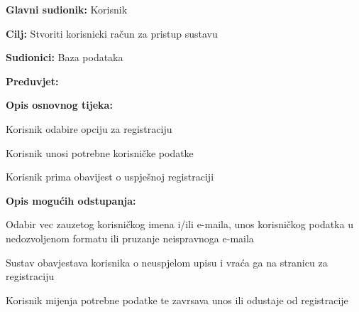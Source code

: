 					\noindent {}
					\begin{packed_item}

						\item \textbf{Glavni sudionik:} Korisnik
						\item  \textbf{Cilj:} Stvoriti korisnicki račun za pristup sustavu
						\item  \textbf{Sudionici:} Baza podataka
						\item  \textbf{Preduvjet:} 
						\item  \textbf{Opis osnovnog tijeka:}

						\item[] \begin{packed_enum}

							\item Korisnik odabire opciju za registraciju
							\item Korisnik unosi potrebne korisničke podatke
							\item Korisnik prima obavijest o uspješnoj registraciji 

						\end{packed_enum}

						\item  \textbf{Opis mogućih odstupanja:}

						\item[] \begin{packed_item}

							\item[2.a] Odabir vec zauzetog korisničkog imena i/ili e-maila, unos korisničkog podatka u nedozvoljenom formatu ili pruzanje neispravnoga e-maila 
							\item[] \begin{packed_enum}

								\item Sustav obavjestava korisnika o neuspjelom upisu i vraća ga na stranicu za registraciju
								\item Korisnik mijenja potrebne podatke te zavrsava unos ili odustaje od registracije

							\end{packed_enum}
						\end{packed_item}
					\end{packed_item}

